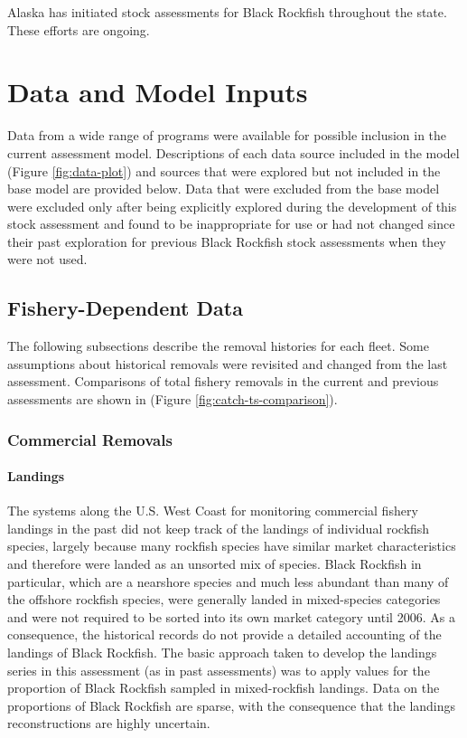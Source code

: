 \documentclass[11pt,
  english,
  letterpaper,
]{article}
\begin{document}
Alaska has initiated stock assessments for Black Rockfish throughout the state. These efforts are ongoing.

\hypertarget{data-and-model-inputs}{%
\section{Data and Model Inputs}\label{data-and-model-inputs}}

Data from a wide range of programs were available for possible inclusion in the current assessment model. Descriptions of each data source included in the model (Figure \ref{fig:data-plot}) and sources that were explored but not included in the base model are provided below. Data that were excluded from the base model were excluded only after being explicitly explored during the development of this stock assessment and found to be inappropriate for use or had not changed since their past exploration for previous Black Rockfish stock assessments when they were not used.

\hypertarget{fishery-dependent-data}{%
\subsection{Fishery-Dependent Data}\label{fishery-dependent-data}}

The following subsections describe the removal histories for each fleet. Some assumptions about historical removals were revisited and changed from the last assessment. Comparisons of total fishery removals in the current and previous assessments are shown in (Figure \ref{fig:catch-ts-comparison}).

\hypertarget{commercial-removals}{%
\subsubsection{Commercial Removals}\label{commercial-removals}}

\hypertarget{com-landings}{%
\paragraph{Landings}\label{com-landings}}

The systems along the U.S. West Coast for monitoring commercial fishery landings in the past did not keep track of the landings of individual rockfish species, largely because many rockfish species have similar market characteristics and therefore were landed as an unsorted mix of species. Black Rockfish in particular, which are a nearshore species and much less abundant than many of the offshore rockfish species, were generally landed in mixed-species categories and were not required to be sorted into its own market category until 2006. As a consequence, the historical records do not provide a detailed accounting of the landings of Black Rockfish. The basic approach taken to develop the landings series in this assessment (as in past assessments) was to apply values for the proportion of Black Rockfish sampled in mixed-rockfish landings. Data on the proportions of Black Rockfish are sparse, with the consequence that the landings reconstructions are highly uncertain.
\end{document}
